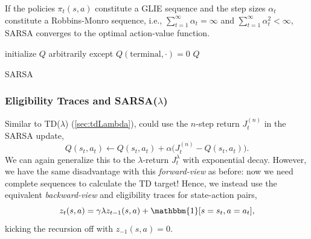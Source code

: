 			\begin{theorem}
				If the policies \( \pi_t(s, a) \) constitute a \ac{GLIE} sequence and the step sizes \(\alpha_t\) constitute a Robbins-Monro sequence, i.e., \( \sum_{t = 1}^{\infty} \alpha_t = \infty \) and \( \sum_{t = 1}^{\infty} \alpha_t^2 < \infty \), \ac{SARSA} converges to the optimal action-value function.
			\end{theorem}

			\begin{algorithm}  \DontPrintSemicolon
				initialize \(Q\) arbitrarily except \(Q(\mathrm{terminal}, \cdot) = 0\) \;
				\Return \(Q\) \;
				\caption{\acs{SARSA}}
				\label{alg:sarsa}
			\end{algorithm}

			\subsubsection{Eligibility Traces and \acs{SARSA}(\(\lambda\))} %
				Similar to \acs{TD}(\(\lambda\)) (\autoref{sec:tdLambda}), could use the \(n\)-step return \(J_t^{(n)}\) in the \ac{SARSA} update,
				\begin{equation}
					Q(s_t, a_t) \gets Q(s_t, a_t) + \alpha \bigl( J_t^{(n)} - Q(s_t, a_t) \bigr).
				\end{equation}
				We can again generalize this to the \(\lambda\)-return \(J_t^\lambda\) with exponential decay. However, we have the same disadvantage with this \emph{forward-view} as before: now we need complete sequences to calculate the TD target! Hence, we instead use the equivalent \emph{backward-view} and eligibility traces for state-action pairs,
				\begin{equation}
					z_t(s, a) = \gamma \lambda z_{t - 1}(s, a) + \mathbbm{1}[s = s_t, a = a_t],
				\end{equation}
				kicking the recursion off with \( z_{-1}(s, a) = 0 \).

